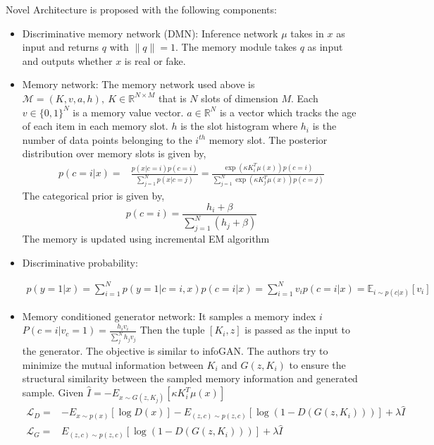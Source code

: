 Novel Architecture is proposed with the following components:
\begin{itemize}
    \item Discriminative memory network (DMN): Inference network $\mu$ takes in $x$ as input and returns $q$ with $\parallel q \parallel = 1$. The memory module takes $q$ as input and outputs whether $x$ is real or fake.
    \item Memory network: The memory network used above is $\mathcal{M}=(K, v, a, h), \  K \in \mathbb{R}^{N \times M}$ that is $N$ slots of dimension $M$. Each $v \in \{ 0, 1\}^N$ is a memory value vector. $a \in \mathbb{R}^N$ is a vector which tracks the age of each item in each memory slot. $h$ is the slot histogram where $h_i$ is the number of data points belonging to the $i^{th}$ memory slot.
    The posterior distribution over memory slots is given by,
    \begin{equation*}
        \begin{aligned}
        p(c=i | x)= &\frac{p(x | c=i) p(c=i)}{\sum_{j=1}^{N} p(x | c=j) }
        = \frac{\exp \left(\kappa K_{i}^{T} \mu(x)\right) p(c=i)}{\sum_{j=1}^{N} \exp \left(\kappa K_{j}^{T} \mu(x)\right) p(c=j)}
        \end{aligned}{}
    \end{equation*}{}
The categorical prior is given by,
$$
p(c=i)=\frac{h_{i}+\beta}{\sum_{j=1}^{N}\left(h_{j}+\beta\right)}
$$ The memory is updated using incremental EM algorithm
\item Discriminative probability: 

\begin{equation*}
    \begin{aligned}
    p(y=1 | x)= \sum_{i=1}^{N} p(y=1 | c=i, x) p(c=i | x)
    =  \sum_{i=1}^{N} v_{i} p(c=i | x)
    =\mathbb{E}_{i \sim p(c | x)}\left[v_{i}\right]
    \end{aligned}{}
\end{equation*}{}

\item Memory conditioned generator network: It samples a memory index $i$ $P\left(c=i | v_{c}=1\right)=\frac{h_{i} v_{i}}{\sum_{j}^{N} h_{j} v_{j}}$
Then the tuple $ [K_i, z]  $ is passed as the input to the generator. The objective is similar to infoGAN. The authors try to minimize the mutual information between $K_i$ and $G(z, K_i)$ to ensure the structural similarity between the sampled memory information and generated sample. Given $\hat{I}=-E_{x \sim G\left(z, K_{j}\right)}\left[\kappa K_{i}^{T} \mu(x)\right]$
\begin{equation}
\label{eq:memGAN}
\begin{aligned}
\mathcal{L}_{D}=&-E_{x \sim p(x)}[\log D(x)]
-E_{(z, c) \sim p(z, c)}\left[\log \left(1-D\left(G\left(z, K_{i}\right)\right)\right)\right]+\lambda \hat{I} \\ \mathcal{L}_{G}=&E_{(z, c) \sim p(z, c)}\left[\log \left(1-D\left(G\left(z, K_{i}\right)\right)\right)\right]+\lambda \hat{I}
\end{aligned}{}
\end{equation}
\end{itemize}


